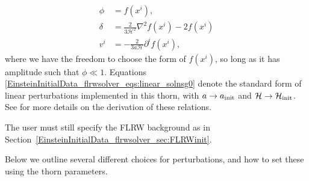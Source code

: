 \begin{subequations} \label{EinsteinInitialData_flrwsolver_eqs:linear_solnsg0}
    \begin{align}
    	\phi &= f(x^{i}), \label{EinsteinInitialData_flrwsolver_eq:linear_phi}\\
     	\delta &= \frac{2}{3\mathcal{H}^2} \nabla^{2}f(x^{i}) - 2 f(x^i) \\ %
     	v^{i} &= -\frac{2}{3 a \mathcal{H}} \partial^{i}f(x^{i}),
    \end{align}
\end{subequations}
where we have the freedom to choose the form of $f(x^i)$, so long as it has amplitude such that $\phi\ll1$. Equations \eqref{EinsteinInitialData_flrwsolver_eqs:linear_solnsg0} denote the standard form of linear perturbations implemented in this thorn, with $a\rightarrow a_{\rm init}$ and $\mathcal{H}\rightarrow\mathcal{H}_{\rm init}$. See \cite{EinsteinInitialData_flrwsolver_macpherson2019} for more details on the derivation of these relations. 

The user must still specify the FLRW background as in Section~\ref{EinsteinInitialData_flrwsolver_sec:FLRWinit}.

Below we outline several different choices for perturbations, and how to set these using the thorn parameters.

